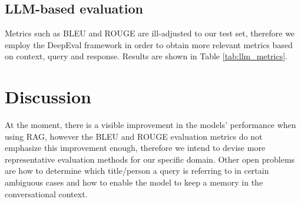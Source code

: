 \documentclass[fleqn,moreauthors,10pt]{ds_report}
\begin{document}
\subsection*{LLM-based evaluation}

Metrics such as BLEU and ROUGE are ill-adjusted to our test set, therefore we employ the DeepEval framework \cite{deepeval} in order to obtain more relevant metrics based on context, query and response. Results are shown in Table \ref{tab:llm_metrics}.

\begin{table*}[!htb]
{}
\caption{Comparison of all models with LLM metrics.}
\label{tab:llm_metrics}
\end{table*}



\section*{Discussion}

At the moment, there is a visible improvement in the models' performance when using RAG, however the BLEU and ROUGE evaluation metrics do not emphasize this improvement enough, therefore we intend to devise more representative evaluation methods for our specific domain. Other open problems are how to determine which title/person a query is referring to in certain ambiguous cases and how to enable the model to keep a memory in the conversational context. 
\end{document}
